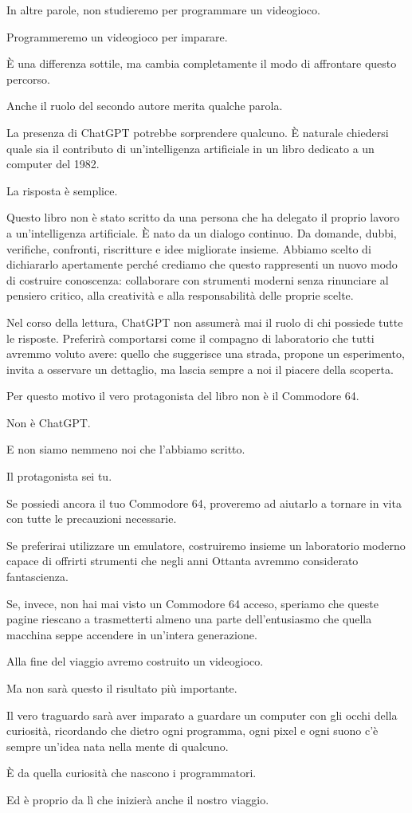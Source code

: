 \documentclass{article}
\begin{document}
In altre parole, non studieremo per programmare un videogioco.

Programmeremo un videogioco per imparare.

È una differenza sottile, ma cambia completamente il modo di affrontare questo percorso.

Anche il ruolo del secondo autore merita qualche parola.

La presenza di ChatGPT potrebbe sorprendere qualcuno. È naturale chiedersi quale sia il contributo di un'intelligenza
artificiale in un libro dedicato a un computer del 1982.

La risposta è semplice.

Questo libro non è stato scritto da una persona che ha delegato il proprio lavoro a un'intelligenza artificiale. È nato
da un dialogo continuo. Da domande, dubbi, verifiche, confronti, riscritture e idee migliorate insieme. Abbiamo scelto
di dichiararlo apertamente perché crediamo che questo rappresenti un nuovo modo di costruire conoscenza: collaborare
con strumenti moderni senza rinunciare al pensiero critico, alla creatività e alla responsabilità delle proprie scelte.

Nel corso della lettura, ChatGPT non assumerà mai il ruolo di chi possiede tutte le risposte. Preferirà comportarsi come
il compagno di laboratorio che tutti avremmo voluto avere: quello che suggerisce una strada, propone un esperimento,
invita a osservare un dettaglio, ma lascia sempre a noi il piacere della scoperta.

Per questo motivo il vero protagonista del libro non è il Commodore 64.

Non è ChatGPT.

E non siamo nemmeno noi che l'abbiamo scritto.

Il protagonista sei tu.

Se possiedi ancora il tuo Commodore 64, proveremo ad aiutarlo a tornare in vita con tutte le precauzioni necessarie.

Se preferirai utilizzare un emulatore, costruiremo insieme un laboratorio moderno capace di offrirti strumenti che negli
anni Ottanta avremmo considerato fantascienza.

Se, invece, non hai mai visto un Commodore 64 acceso, speriamo che queste pagine riescano a trasmetterti almeno una
parte dell'entusiasmo che quella macchina seppe accendere in un'intera generazione.

Alla fine del viaggio avremo costruito un videogioco.

Ma non sarà questo il risultato più importante.

Il vero traguardo sarà aver imparato a guardare un computer con gli occhi della curiosità, ricordando che dietro ogni
programma, ogni pixel e ogni suono c'è sempre un'idea nata nella mente di qualcuno.

È da quella curiosità che nascono i programmatori.

Ed è proprio da lì che inizierà anche il nostro viaggio.


\bigskip
\end{document}
